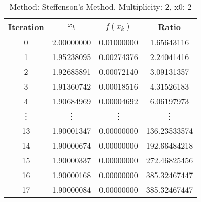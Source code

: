 \begin{table}
\centering
\caption{Method: Steffenson's Method, Multiplicity: 2, x0: 2}
\label{tab:table_Steffenson's_Method_2_2}
\begin{tabular}{c c c c}
\toprule
Iteration &      $x_k$ &   $f(x_k)$ &        Ratio \\
\midrule
        0 & 2.00000000 & 0.01000000 &   1.65643116 \\
        1 & 1.95238095 & 0.00274376 &   2.24041416 \\
        2 & 1.92685891 & 0.00072140 &   3.09131357 \\
        3 & 1.91360742 & 0.00018516 &   4.31526183 \\
        4 & 1.90684969 & 0.00004692 &   6.06197973 \\
   \vdots &     \vdots &     \vdots &       \vdots \\
       13 & 1.90001347 & 0.00000000 & 136.23533574 \\
       14 & 1.90000674 & 0.00000000 & 192.66484218 \\
       15 & 1.90000337 & 0.00000000 & 272.46825456 \\
       16 & 1.90000168 & 0.00000000 & 385.32467447 \\
       17 & 1.90000084 & 0.00000000 & 385.32467447 \\
\bottomrule
\end{tabular}
\end{table}
